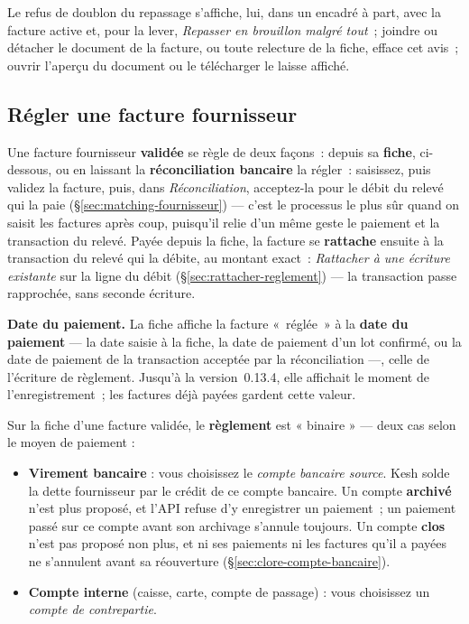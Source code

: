 \documentclass[a4paper,11pt,oneside]{article}
\begin{document}
Le refus de doublon du repassage s'affiche, lui, dans un encadré à part, avec la facture
active et, pour la lever, \emph{Repasser en brouillon malgré tout}~; joindre ou détacher le
document de la facture, ou toute relecture de la fiche, efface cet avis~; ouvrir l'aperçu du
document ou le télécharger le laisse affiché.

\subsection{Régler une facture fournisseur}\label{sec:regler-facture-fournisseur}

Une facture fournisseur \textbf{validée} se règle de deux façons~: depuis sa \textbf{fiche}, ci-dessous,
ou en laissant la \textbf{réconciliation bancaire} la régler~: saisissez, puis validez la facture, puis,
dans \emph{Réconciliation}, acceptez-la pour le débit du relevé qui la paie
(\S\ref{sec:matching-fournisseur}) --- c'est le processus le plus sûr quand on saisit les factures
après coup, puisqu'il relie d'un même geste le paiement et la transaction du relevé. Payée
depuis la fiche, la facture se \textbf{rattache} ensuite à la transaction du relevé qui la
débite, au montant exact~: \emph{Rattacher à une écriture existante} sur la ligne du débit
(\S\ref{sec:rattacher-reglement}) --- la transaction passe rapprochée, sans seconde écriture.

\textbf{Date du paiement.} La fiche affiche la facture «~réglée~» à la \textbf{date du paiement}
--- la date saisie à la fiche, la date de paiement d'un lot confirmé, ou la date de paiement de
la transaction acceptée par la réconciliation ---, celle de l'écriture de règlement. Jusqu'à la
version~0.13.4, elle affichait le moment de l'enregistrement~; les factures déjà payées gardent
cette valeur.

Sur la fiche d'une facture validée, le \textbf{règlement} est « binaire » — deux
cas selon le moyen de paiement :

\begin{itemize}
    \item \textbf{Virement bancaire} : vous choisissez le \emph{compte bancaire
    source}. Kesh solde la dette fournisseur par le crédit de ce compte bancaire. Un compte
    \textbf{archivé} n'est plus proposé, et l'API refuse d'y enregistrer un paiement~; un paiement
    passé sur ce compte avant son archivage s'annule toujours. Un compte \textbf{clos} n'est pas
    proposé non plus, et ni ses paiements ni les factures qu'il a payées ne s'annulent avant sa
    réouverture (\S\ref{sec:clore-compte-bancaire}).
    \item \textbf{Compte interne} (caisse, carte, compte de passage) : vous
    choisissez un \emph{compte de contrepartie}.
\end{itemize}
\end{document}
